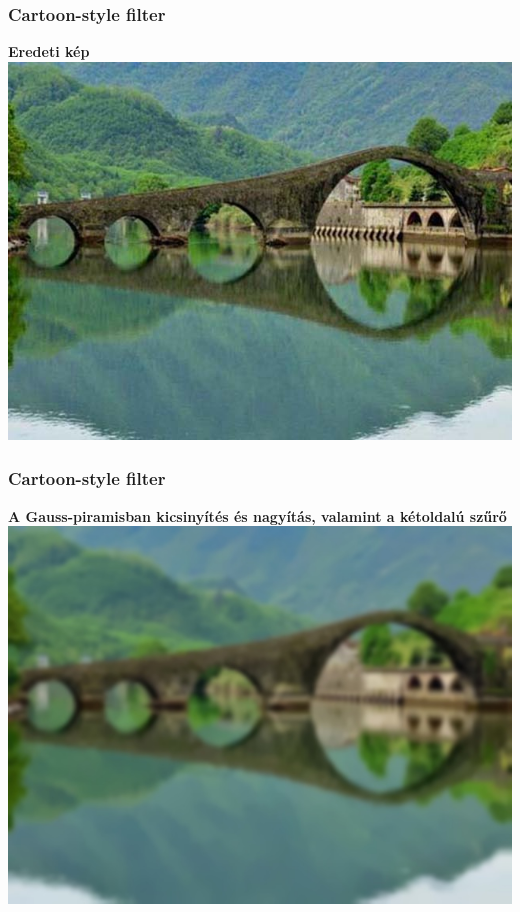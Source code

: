 \documentclass{beamer}
\begin{document}
\begin{frame}[fragile]
\frametitle{Cartoon-style filter}
\begin{center}
\textbf{Eredeti kép}
\includegraphics[scale=0.42]{kepek/cartoon_style/image.jpg}
\end{center}
\end{frame}

\begin{frame}[fragile]
\frametitle{Cartoon-style filter}
\begin{center}
\textbf{A Gauss-piramisban kicsinyítés és nagyítás, valamint a kétoldalú szűrő}
\includegraphics[scale=0.42]{kepek/cartoon_style/pyrambilateral.jpg}
\end{center}
\end{frame}
\end{document}
